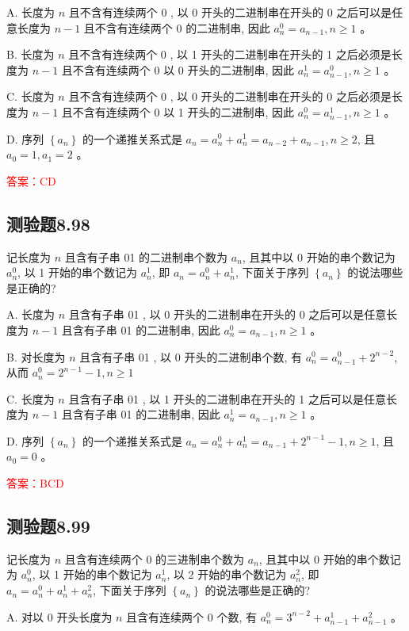 \documentclass[UTF8, heading=true]{ctexart}
\begin{document}
A. 长度为 $n$ 且不含有连续两个 0 , 以 0 开头的二进制串在开头的 0 之后可以是任意长度为 $n-1$ 且不含有连续两个 0 的二进制串, 因此 $a_n^0=a_{n-1}, n \geq 1$ 。

B. 长度为 $n$ 且不含有连续两个 0 , 以 1 开头的二进制串在开头的 1 之后必须是长度为 $n-1$ 且不含有连续两个 0 以 0 开头的二进制串, 因此 $a_n^1=a_{n-1}^0, n \geq 1$ 。

C. 长度为 $n$ 且不含有连续两个 0 , 以 0 开头的二进制串在开头的 0 之后必须是长度为 $n-1$ 且不含有连续两个 0 以 1 开头的二进制串, 因此 $a_n^0=a_{n-1}^1, n \geq 1$ 。

D. 序列 $\left\{a_n\right\}$ 的一个递推关系式是 $a_n=a_n^0+a_n^1=a_{n-2}+a_{n-1}, n \geq 2$, 且 $a_0=1, a_1=2$ 。

\textcolor{red}{答案：CD}

\subsection{测验题8.98}

记长度为 $n$ 且含有子串 01 的二进制串个数为 $a_n$, 且其中以 0 开始的串个数记为 $a_n^0$, 以 1 开始的串个数记为 $a_n^1$, 即 $a_n=a_n^0+a_n^1$, 下面关于序列 $\left\{a_n\right\}$ 的说法哪些是正确的?

A. 
长度为 $n$ 且含有子串 01 , 以 0 开头的二进制串在开头的 0 之后可以是任意长度为 $n-1$ 且含有子串 01 的二进制串, 因此 $a_n^0=a_{n-1}, n \geq 1$ 。

B. 
对长度为 $n$ 且含有子串 01 , 以 0 开头的二进制串个数, 有 $a_n^0=a_{n-1}^0+2^{n-2}$, 从而 $a_n^0=2^{n-1}-1, n \geq 1$

C. 
长度为 $n$ 且含有子串 01 , 以 1 开头的二进制串在开头的 1 之后可以是任意长度为 $n-1$ 且含有子串 01 的二进制串, 因此 $a_n^1=a_{n-1}, n \geq 1$ 。

D. 
序列 $\left\{a_n\right\}$ 的一个递推关系式是 $a_n=a_n^0+a_n^1=a_{n-1}+2^{n-1}-1, n \geq 1$, 且 $a_0=0$ 。

\textcolor{red}{答案：BCD}


\subsection{测验题8.99}

记长度为 $n$ 且含有连续两个 0 的三进制串个数为 $a_n$, 且其中以 0 开始的串个数记为 $a_n^0$, 以 1 开始的串个数记为 $a_n^1$, 以 2 开始的串个数记为 $a_n^2$, 即 $a_n=a_n^0+a_n^1+a_n^2$, 下面关于序列 $\left\{a_n\right\}$ 的说法哪些是正确的?

A. 对以 0 开头长度为 $n$ 且含有连续两个 0 个数, 有 $a_n^0=3^{n-2}+a_{n-1}^1+a_{n-1}^2$ 。
\end{document}
